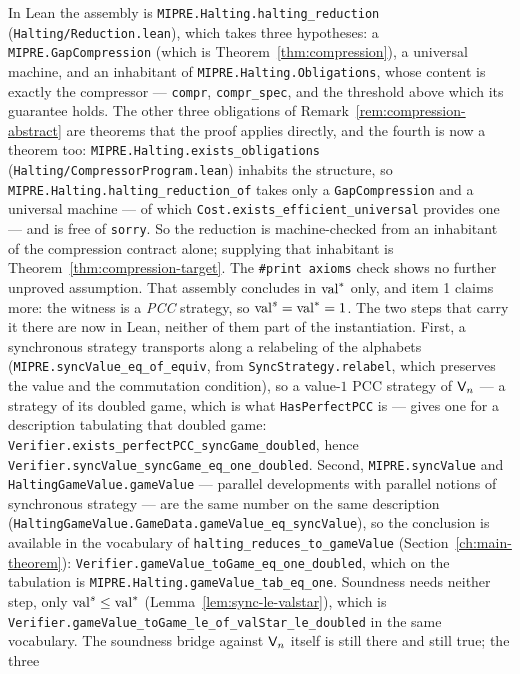 In Lean the assembly is \texttt{MIPRE.Halting.halting\_reduction}
(\texttt{Halting/Reduction.lean}), which takes three hypotheses: a
\texttt{MIPRE.GapCompression} (which is Theorem~\ref{thm:compression}), a universal machine,
and an inhabitant of \texttt{MIPRE.Halting.Obligations}, whose content is exactly the
compressor --- \texttt{compr}, \texttt{compr\_spec}, and the threshold above which its
guarantee holds. The other three obligations of Remark~\ref{rem:compression-abstract} are
theorems that the proof applies directly, and the fourth is now a theorem too:
\texttt{MIPRE.Halting.exists\_obligations} (\texttt{Halting/CompressorProgram.lean})
inhabits the structure, so \texttt{MIPRE.Halting.halting\_reduction\_of} takes only a
\texttt{GapCompression} and a universal machine --- of which
\texttt{Cost.exists\_efficient\_universal} provides one --- and is free of \texttt{sorry}.
So the reduction is machine-checked from an inhabitant of the compression contract
alone; supplying that inhabitant is Theorem~\ref{thm:compression-target}. The
\texttt{\#print axioms} check shows no further unproved assumption.
That assembly concludes in $\mathrm{val}^*$ only, and item 1 claims more: the witness is a
\emph{PCC} strategy, so $\mathrm{val}^{s} = \mathrm{val}^* = 1$. The two steps that carry it there are now in
Lean, neither of them part of the instantiation. First, a synchronous strategy transports along
a relabeling of the alphabets (\texttt{MIPRE.syncValue\_eq\_of\_equiv}, from
\texttt{SyncStrategy.relabel}, which preserves the value and the commutation condition), so a
value-$1$ PCC strategy of $\mathsf{V}_n$ --- a strategy of its doubled game, which is what
\texttt{HasPerfectPCC} is --- gives one for a description tabulating that doubled game:
\texttt{Verifier.exists\_perfectPCC\_syncGame\_doubled}, hence
\texttt{Verifier.syncValue\_syncGame\_eq\_one\_doubled}. Second, \texttt{MIPRE.syncValue} and
\texttt{HaltingGameValue.gameValue} --- parallel developments with parallel notions of
synchronous strategy --- are the same number on the same description
(\texttt{HaltingGameValue.GameData.gameValue\_eq\_syncValue}), so the conclusion is available
in the vocabulary of \texttt{halting\_reduces\_to\_gameValue}
(Section~\ref{ch:main-theorem}): \texttt{Verifier.gameValue\_toGame\_eq\_one\_doubled}, which
on the tabulation is \texttt{MIPRE.Halting.gameValue\_tab\_eq\_one}. Soundness needs neither
step, only $\mathrm{val}^{s} \leq \mathrm{val}^*$ (Lemma~\ref{lem:sync-le-valstar}), which is
\texttt{Verifier.gameValue\_toGame\_le\_of\_valStar\_le\_doubled} in the same vocabulary. The
soundness bridge against $\mathsf{V}_n$ itself is still there and still true; the three
